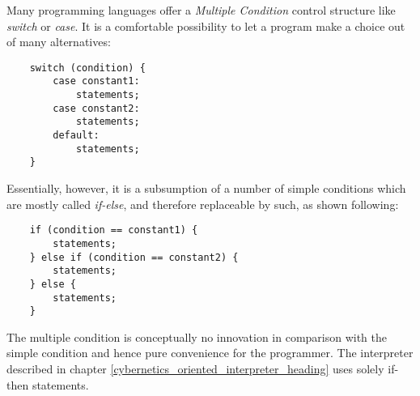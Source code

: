 Many programming languages offer a \emph{Multiple Condition} control structure
like \emph{switch} or \emph{case}. It is a comfortable possibility to let a
program make a choice out of many alternatives:

\begin{scriptsize}
    \begin{verbatim}
    switch (condition) {
        case constant1:
            statements;
        case constant2:
            statements;
        default:
            statements;
    }
    \end{verbatim}
\end{scriptsize}

Essentially, however, it is a subsumption of a number of simple conditions which
are mostly called \emph{if-else}, and therefore replaceable by such, as shown
following:

\begin{scriptsize}
    \begin{verbatim}
    if (condition == constant1) {
        statements;
    } else if (condition == constant2) {
        statements;
    } else {
        statements;
    }
    \end{verbatim}
\end{scriptsize}

The multiple condition is conceptually no innovation in comparison with the
simple condition and hence pure convenience for the programmer. The interpreter
described in chapter \ref{cybernetics_oriented_interpreter_heading} uses solely
if-then statements.
